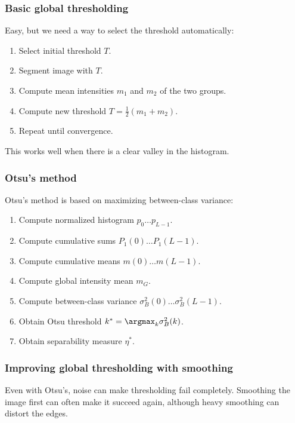 \subsubsection{Basic global thresholding}
Easy, but we need a way to select the threshold automatically:
\begin{enumerate}
    \item Select initial threshold $T$.
    \item Segment image with $T$.
    \item Compute mean intensities $m_1$ and $m_2$ of the two groups.
    \item Compute new threshold $T = \frac{1}{2}(m_1 + m_2)$.
    \item Repeat until convergence.
\end{enumerate}
This works well when there is a clear valley in the histogram.

\subsubsection{Otsu's method}
Otsu's method is based on maximizing between-class variance:
\begin{enumerate}
    \item Compute normalized histogram $p_0 \dots p_{L-1}$.
    \item Compute cumulative sums $P_1(0) \dots P_1(L-1)$.
    \item Compute cumulative means $m(0) \dots m(L-1)$.
    \item Compute global intensity mean $m_G$.
    \item Compute between-class variance $\sigma_B^2(0) \dots \sigma_B^2(L-1)$.
    \item Obtain Otsu threshold $k^* = \argmax_k \sigma_B^2(k)$.
    \item Obtain separability measure $\eta^*$.
\end{enumerate}

\subsubsection{Improving global thresholding with smoothing}
Even with Otsu's, noise can make thresholding fail completely. Smoothing the image first can often make it succeed again, although heavy smoothing can distort the edges.

